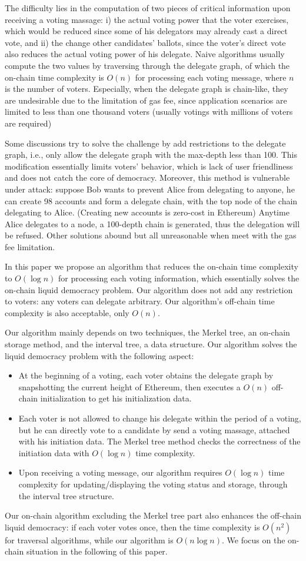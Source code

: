  The difficulty lies in the computation of two pieces of critical information upon receiving a voting massage: i) the actual voting power that the voter exercises, which would be reduced since some of his delegators may already cast a direct vote, and ii) the change other candidates' ballots, since the voter's direct vote also reduces the actual voting power of his delegate. Naive algorithms usually compute the two values by traversing through the delegate graph, of which the on-chain time complexity is $O(n)$ for processing each voting message, where $n$ is the number of voters. Especially, when the delegate graph is chain-like, they are undesirable due to the limitation of gas fee, since application scenarios are limited to less than one thousand voters (usually votings with millions of voters are required)

Some discussions try to solve the challenge by add restrictions to the delegate graph, i.e., only allow the delegate graph with the max-depth less than 100. This modification essentially limits voters' behavior, which is lack of user friendliness and does not catch the core of democracy. Moreover, this method is vulnerable under attack: suppose Bob wants to prevent Alice from delegating to anyone, he can create 98 accounts and form a delegate chain, with the top node of the chain delegating to Alice. (Creating new accounts is zero-cost in Ethereum) Anytime Alice delegates to a node, a 100-depth chain is generated, thus the delegation will be refused. Other solutions abound but all unreasonable when meet with the gas fee limitation. 

In this paper we propose an algorithm that reduces the on-chain time complexity to $O(\log n)$ for processing each voting information, which essentially solves the on-chain liquid democracy problem. Our algorithm does not add any restriction to voters: any voters can delegate arbitrary. Our algorithm's off-chain time complexity is also acceptable, only $O(n)$. 

Our algorithm mainly depends on two techniques, the Merkel tree, an on-chain storage method, and the interval tree, a data structure. Our algorithm solves the liquid democracy  problem with the following aspect: 
\begin{itemize}
\item At the beginning of a voting, each voter obtains the delegate graph by snapshotting the current height of Ethereum, then executes a $O(n)$ off-chain initialization to get his initialization data.  
\item  Each voter is not allowed to change his delegate within the period of a voting, but he can directly vote to a candidate by send a voting massage, attached with his initiation data. The Merkel tree method checks the correctness of the initiation data with $O(\log n)$ time complexity. 
\item Upon receiving a voting message, our algorithm requires $O(\log n)$ time complexity for updating/displaying the voting status and storage, through the interval tree structure. 
\end{itemize}

Our on-chain algorithm excluding the Merkel tree part also enhances the off-chain liquid democracy: if each voter votes once, then the time complexity is $O(n^2)$ for traversal algorithms, while our algorithm is $O(n\log n)$. We focus on the on-chain situation in the following of this paper. 
